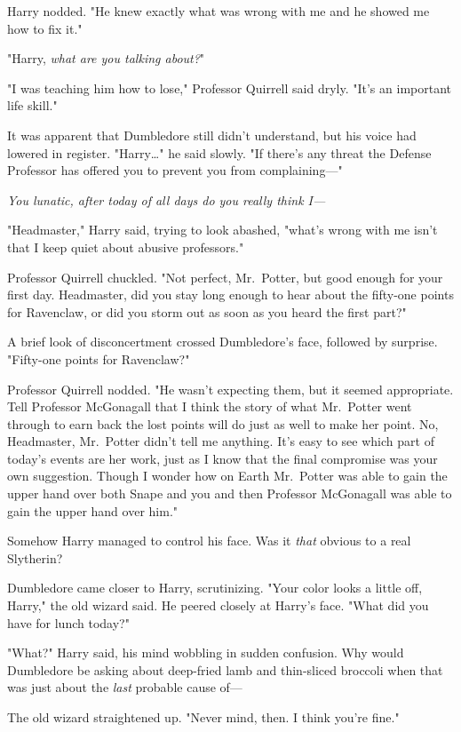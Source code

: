 Harry nodded. "He knew exactly what was wrong with me and he showed me how to
fix it."

"Harry, \emph{what are you talking about?}"

"I was teaching him how to lose," Professor Quirrell said dryly. "It's an
important life skill."

It was apparent that Dumbledore still didn't understand, but his voice had
lowered in register. "Harry{\ldots}" he said slowly. "If there's any threat the
Defense Professor has offered you to prevent you from complaining---"

\emph{You lunatic, after today of all days do you really think I---}

"Headmaster," Harry said, trying to look abashed, "what's wrong with me isn't
that I keep quiet about abusive professors."

Professor Quirrell chuckled. "Not perfect, Mr.~Potter, but good enough for your
first day. Headmaster, did you stay long enough to hear about the fifty-one
points for Ravenclaw, or did you storm out as soon as you heard the first part?"

A brief look of disconcertment crossed Dumbledore's face, followed by surprise.
"Fifty-one points for Ravenclaw?"

Professor Quirrell nodded. "He wasn't expecting them, but it seemed
appropriate. Tell Professor McGonagall that I think the story of what
Mr.~Potter went through to earn back the lost points will do just as well to
make her point. No, Headmaster, Mr.~Potter didn't tell me anything. It's easy
to see which part of today's events are her work, just as I know that the final
compromise was your own suggestion. Though I wonder how on Earth Mr.~Potter was
able to gain the upper hand over both Snape and you and then Professor
McGonagall was able to gain the upper hand over him."

Somehow Harry managed to control his face. Was it \emph{that} obvious to a real
Slytherin?

Dumbledore came closer to Harry, scrutinizing. "Your color looks a little off,
Harry," the old wizard said. He peered closely at Harry's face. "What did you
have for lunch today?"

"What?" Harry said, his mind wobbling in sudden confusion. Why would Dumbledore
be asking about deep-fried lamb and thin-sliced broccoli when that was just
about the \emph{last} probable cause of---

The old wizard straightened up. "Never mind, then. I think you're fine."

